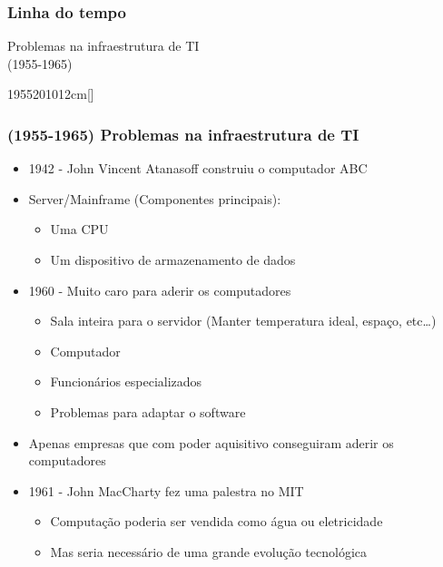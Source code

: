 \begin{frame}
	\frametitle{Linha do tempo}
	\begin{center}
		Problemas na infraestrutura de TI \\ (1955-1965)
	\end{center}
	\hfill
	\begin{scriptsize}
	\begin{bf}
	\begin{center}
		\begin{chronology}[10]{1955}{2010}{12cm}[\textwidth]
			\color{lightgreen}
		\end{chronology}
	\end{center}
	\end{bf}
	\end{scriptsize}
\end{frame}

\begin{frame}[allowframebreaks]
	\frametitle{(1955-1965) Problemas na infraestrutura de TI}
	\begin{itemize}
		\item 1942 - John Vincent Atanasoff construiu o computador ABC
		\item Server/Mainframe (Componentes principais):
			\begin{itemize}
				\item Uma CPU
				\item Um dispositivo de armazenamento de dados
			\end{itemize}
		\item 1960 - Muito caro para aderir os computadores
			\begin{itemize}
				\item Sala inteira para o servidor (Manter temperatura ideal, espaço, etc\dots)
				\item Computador
				\item Funcionários especializados
				\item Problemas para adaptar o software
			\end{itemize}
		\item Apenas empresas que com poder aquisitivo conseguiram aderir os computadores
		\item 1961 - John MacCharty fez uma palestra no MIT
			\begin{itemize}
				\item Computação poderia ser vendida como água ou eletricidade \cite{SimsonTCI}
				\item Mas seria necessário de uma grande evolução tecnológica
			\end{itemize}
	\end{itemize}
\end{frame}

